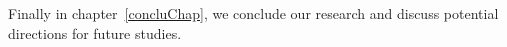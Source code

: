 \subsection{}
\vspace{-30.0pt}
Finally in chapter~\ref{concluChap}, we conclude our research and discuss potential directions for
future studies. 





